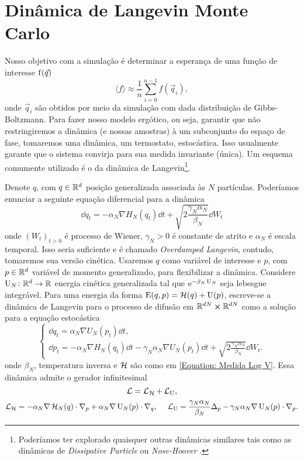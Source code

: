 \section{Dinâmica de Langevin Monte Carlo}

Nosso objetivo com a simulação é determinar a esperança de uma função de interesse $\operatorname{f}(\vec{q})$ $$\langle f \rangle \approx \frac{1}{n} \sum_{i=0}^{n-1} f(\vec{q}_i),$$ onde $\vec{q}_i$ são obtidos por meio da simulação com dada distribuição de Gibbs-Boltzmann. Para fazer nosso modelo ergótico, ou seja, garantir que não restringiremos a dinâmica (e nossas amostras) à um subconjunto do espaço de fase, tomaremos uma dinâmica, um termostato, estocástica. Isso usualmente garante que o sistema convirja para sua medida invariante (única). Um esquema comumente utilizado é o da dinâmica de Langevin\footnote{Poderíamos ter explorado quaisquer outras dinâmicas similares tais como as dinâmicas de \textit{Dissipative Particle} \cite{DPD} ou \textit{Nose-Hoover} \cite{Hoover}.}.

Denote $q$, com $q \in \mathbb{R}^d$ posição generalizada associada às $N$ partículas. Poderíamos enunciar a seguinte equação diferencial para a dinâmica
\begin{equation}
	\dd q_t = -\alpha_N \nabla H_N(q_t) \dd t + \sqrt{2\frac{\gamma_N \alpha_N}{\beta_N}} \dd W_t
	\label{Equação: Langevin Overdamped}
\end{equation}
onde $(W_t)_{t>0}$ é processo de Wiener, $\gamma_N > 0$ é constante de atrito e $\alpha_N$ é escala temporal. Isso seria suficiente e é chamado \textit{Overdamped Langevin}, contudo, tomaremos sua versão cinética. Usaremos $q$ como variável de interesse e $p$, com $p \in \mathbb{R}^d$ variável de momento generalizado, para flexibilizar a dinâmica. Considere $\operatorname{U}_N \colon \mathbb{R}^d \rightarrow \mathbb{R}$ energia cinética generalizada tal que $\operatorname{e}^{-\beta_N \operatorname{U}_N}$ seja lebesgue integrável. Para uma energia da forma $\operatorname{E}(q,p) = \operatorname{\mathcal{H}}(q) + \operatorname{U}(p)$, escreve-se \cite{Stoltz2018} a dinâmica de Langevin para o processo de difusão em $\mathbb{R}^{dN} \cross \mathbb{R}^{dN}$ como a solução para a equação estocástica 
\begin{equation}
\begin{cases}
	\dd q_t = \alpha_N \nabla U_N (p_t) \dd t, \\
	\dd p_t = -\alpha_N \nabla H_N(q_t) \dd t - \gamma_N \alpha_N \nabla U_N(p_t) \dd t + \sqrt{2\frac{\gamma_N \alpha_N}{\beta_N}} \dd W_t.
\end{cases}
\label{Equação: EqDif - Dinamica Langevin}
\end{equation}
onde $\beta_N$, temperatura inversa e $\operatorname{\mathcal{H}}$ são como em \ref{Equation: Medida Log V}. Essa dinâmica admite o gerador infinitesimal 
\[
	\operatorname{\mathcal{L}} = \operatorname{\mathcal{L}}_{\operatorname{\mathcal{H}}} + \operatorname{\mathcal{L}}_{\operatorname{U}},
\]
\[
 \operatorname{\mathcal{L}}_{\operatorname{\mathcal{H}}} = -\alpha_N \nabla\operatorname{\mathcal{H}}_N(q) \cdot \nabla_p + \alpha_N \nabla \operatorname{U}_N(p) \cdot \nabla_q, \ \ \ \ \operatorname{\mathcal{L}}_{\operatorname{U}} = \frac{\gamma_N\alpha_N}{\beta_N} \Delta_p - \gamma_N \alpha_N \nabla \operatorname{U}_N(p) \cdot \nabla_p.
\]

